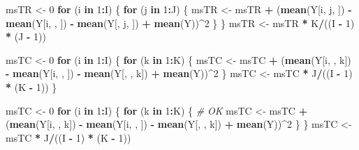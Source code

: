\documentclass[
]{book}
\newenvironment{Shaded}{\begin{snugshade}}{\end{snugshade}}
\newcommand{\CommentTok}[1]{\textcolor[rgb]{0.56,0.35,0.01}{\textit{#1}}}
\newcommand{\ControlFlowTok}[1]{\textcolor[rgb]{0.13,0.29,0.53}{\textbf{#1}}}
\newcommand{\DecValTok}[1]{\textcolor[rgb]{0.00,0.00,0.81}{#1}}
\newcommand{\KeywordTok}[1]{\textcolor[rgb]{0.13,0.29,0.53}{\textbf{#1}}}
\newcommand{\NormalTok}[1]{#1}
\newcommand{\OperatorTok}[1]{\textcolor[rgb]{0.81,0.36,0.00}{\textbf{#1}}}
\newcommand{\StringTok}[1]{\textcolor[rgb]{0.31,0.60,0.02}{#1}}
\begin{document}
\begin{Shaded}
\begin{Highlighting}[]
\NormalTok{msTR <-}\StringTok{ }\DecValTok{0}
\ControlFlowTok{for}\NormalTok{ (i }\ControlFlowTok{in} \DecValTok{1}\OperatorTok{:}\NormalTok{I) \{}
  \ControlFlowTok{for}\NormalTok{ (j }\ControlFlowTok{in} \DecValTok{1}\OperatorTok{:}\NormalTok{J) \{}
\NormalTok{    msTR <-}\StringTok{ }\NormalTok{msTR }\OperatorTok{+}\StringTok{ }
\StringTok{      }\NormalTok{(}\KeywordTok{mean}\NormalTok{(Y[i, j, ]) }\OperatorTok{-}\StringTok{ }\KeywordTok{mean}\NormalTok{(Y[i, , ]) }\OperatorTok{-}\StringTok{ }\KeywordTok{mean}\NormalTok{(Y[, j, ]) }\OperatorTok{+}\StringTok{ }\KeywordTok{mean}\NormalTok{(Y))}\OperatorTok{^}\DecValTok{2}
\NormalTok{  \}}
\NormalTok{\}}
\NormalTok{msTR <-}\StringTok{ }\NormalTok{msTR }\OperatorTok{*}\StringTok{ }\NormalTok{K}\OperatorTok{/}\NormalTok{((I }\OperatorTok{-}\StringTok{ }\DecValTok{1}\NormalTok{) }\OperatorTok{*}\StringTok{ }\NormalTok{(J }\OperatorTok{-}\StringTok{ }\DecValTok{1}\NormalTok{))}

\NormalTok{msTC <-}\StringTok{ }\DecValTok{0}
\ControlFlowTok{for}\NormalTok{ (i }\ControlFlowTok{in} \DecValTok{1}\OperatorTok{:}\NormalTok{I) \{}
  \ControlFlowTok{for}\NormalTok{ (k }\ControlFlowTok{in} \DecValTok{1}\OperatorTok{:}\NormalTok{K) \{}
\NormalTok{    msTC <-}\StringTok{ }\NormalTok{msTC }\OperatorTok{+}\StringTok{ }
\StringTok{      }\NormalTok{(}\KeywordTok{mean}\NormalTok{(Y[i, , k]) }\OperatorTok{-}\StringTok{ }\KeywordTok{mean}\NormalTok{(Y[i, , ]) }\OperatorTok{-}\StringTok{ }\KeywordTok{mean}\NormalTok{(Y[, , k]) }\OperatorTok{+}\StringTok{ }\KeywordTok{mean}\NormalTok{(Y))}\OperatorTok{^}\DecValTok{2}
\NormalTok{  \}}
\NormalTok{  msTC <-}\StringTok{ }\NormalTok{msTC }\OperatorTok{*}\StringTok{ }\NormalTok{J}\OperatorTok{/}\NormalTok{((I }\OperatorTok{-}\StringTok{ }\DecValTok{1}\NormalTok{) }\OperatorTok{*}\StringTok{ }\NormalTok{(K }\OperatorTok{-}\StringTok{ }\DecValTok{1}\NormalTok{))}
\NormalTok{\} }

\NormalTok{msTC <-}\StringTok{ }\DecValTok{0}
\ControlFlowTok{for}\NormalTok{ (i }\ControlFlowTok{in} \DecValTok{1}\OperatorTok{:}\NormalTok{I) \{}
  \ControlFlowTok{for}\NormalTok{ (k }\ControlFlowTok{in} \DecValTok{1}\OperatorTok{:}\NormalTok{K) \{ }\CommentTok{# OK}
\NormalTok{    msTC <-}\StringTok{ }\NormalTok{msTC }\OperatorTok{+}\StringTok{ }
\StringTok{      }\NormalTok{(}\KeywordTok{mean}\NormalTok{(Y[i, , k]) }\OperatorTok{-}\StringTok{ }\KeywordTok{mean}\NormalTok{(Y[i, , ]) }\OperatorTok{-}\StringTok{ }\KeywordTok{mean}\NormalTok{(Y[, , k]) }\OperatorTok{+}\StringTok{ }\KeywordTok{mean}\NormalTok{(Y))}\OperatorTok{^}\DecValTok{2}
\NormalTok{  \}}
\NormalTok{\}}
\NormalTok{msTC <-}\StringTok{ }\NormalTok{msTC }\OperatorTok{*}\StringTok{ }\NormalTok{J}\OperatorTok{/}\NormalTok{((I }\OperatorTok{-}\StringTok{ }\DecValTok{1}\NormalTok{) }\OperatorTok{*}\StringTok{ }\NormalTok{(K }\OperatorTok{-}\StringTok{ }\DecValTok{1}\NormalTok{))}


\end{Highlighting}
\end{Shaded}
\end{document}
